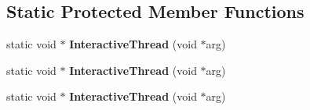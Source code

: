\subsection*{Static Protected Member Functions}
\begin{DoxyCompactItemize}
\item 
\hypertarget{classToolChain_a7f6fcdce202336463b71aa5167758bd2}{static void $\ast$ {\bfseries Interactive\-Thread} (void $\ast$arg)}\label{classToolChain_a7f6fcdce202336463b71aa5167758bd2}

\item 
\hypertarget{classToolChain_a3d65ca640f36c6ebb445c54d87e6df55}{static void $\ast$ {\bfseries Interactive\-Thread} (void $\ast$arg)}\label{classToolChain_a3d65ca640f36c6ebb445c54d87e6df55}

\item 
\hypertarget{classToolChain_a3d65ca640f36c6ebb445c54d87e6df55}{static void $\ast$ {\bfseries Interactive\-Thread} (void $\ast$arg)}\label{classToolChain_a3d65ca640f36c6ebb445c54d87e6df55}

\end{DoxyCompactItemize}
